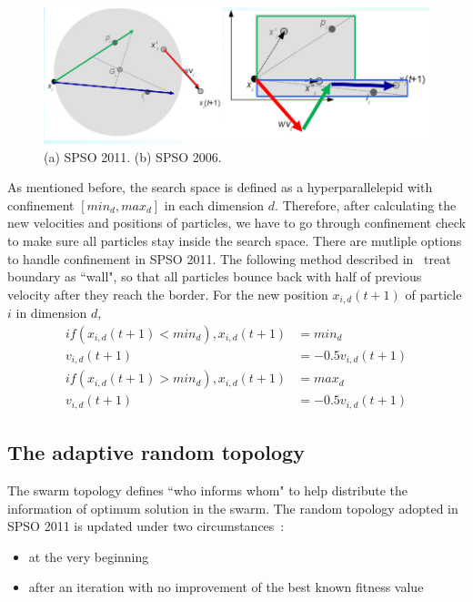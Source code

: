 \begin{figure}[!t] \centering
\includegraphics[width=\textwidth]{SPSO_update}
\caption{(a) SPSO 2011. (b) SPSO 2006.}\label{fig:SPSO_update}
\end{figure} 

As mentioned before, the search space is defined as a hyperparallelepid with confinement $[min_d, max_d]$ in each dimension $d$.
Therefore, after calculating the new velocities and positions of particles, we have to go through confinement check to make sure all particles stay inside the search space.
There are mutliple options to handle confinement in SPSO 2011.
The following method described in~\cite{Clerc:2012:SPSO2011} treat boundary as ``wall", so that all particles bounce back with half of previous velocity after they reach the border.
For the new position $x_{i,d}(t+1)$ of particle $i$ in dimension $d$,
\begin{align*}
if (x_{i,d}(t+1) < min_d), x_{i,d}(t+1) &= min_d \\
                           v_{i,d}(t+1) &= -0.5v_{i,d}(t+1) \\
if (x_{i,d}(t+1) > min_d), x_{i,d}(t+1) &= max_d \\
                           v_{i,d}(t+1) &= -0.5v_{i,d}(t+1) \end{align*} 



\subsection{The adaptive random topology} 
The swarm topology defines ``who informs whom" to help distribute the information of optimum solution in the swarm.
The random topology adopted in SPSO 2011 is updated under two circumstances~\cite{Clerc:2012:SPSO2011}:
\begin{itemize}
\item at the very beginning
\item after an iteration with no improvement of the best known fitness value
\end{itemize}

